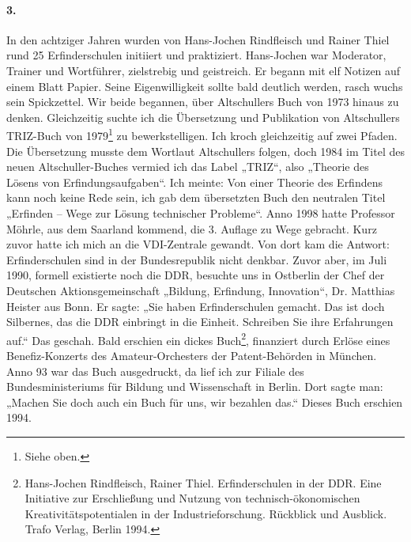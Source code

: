 \documentclass[12pt,a4paper]{article}
\begin{document}
\paragraph{3.}
In den achtziger Jahren wurden von Hans-Jochen Rindfleisch und Rainer Thiel
rund 25 Erfinderschulen initiiert und praktiziert. Hans-Jochen war Moderator,
Trainer und Wortführer, zielstrebig und geistreich. Er begann mit elf Notizen
auf einem Blatt Papier. Seine Eigenwilligkeit sollte bald deutlich werden,
rasch wuchs sein Spickzettel. Wir beide begannen, über Altschullers Buch von
1973 hinaus zu denken. Gleichzeitig suchte ich die Übersetzung und Publikation
von Altschullers TRIZ-Buch von 1979\footnote{Siehe oben.} zu bewerkstelligen.
Ich kroch gleichzeitig auf zwei Pfaden. Die Übersetzung musste dem Wortlaut
Altschullers folgen, doch 1984 im Titel des neuen Altschuller-Buches vermied
ich das Label „TRIZ“, also „Theorie des Lösens von Erfindungsaufgaben“. Ich
meinte: Von einer Theorie des Erfindens kann noch keine Rede sein, ich gab dem
übersetzten Buch den neutralen Titel „Erfinden – Wege zur Lösung technischer
Probleme“. Anno 1998 hatte Professor Möhrle, aus dem Saarland kommend, die
3. Auflage zu Wege gebracht. Kurz zuvor hatte ich mich an die VDI-Zentrale
gewandt. Von dort kam die Antwort: Erfinderschulen sind in der Bundesrepublik
nicht denkbar.  Zuvor aber, im Juli 1990, formell existierte noch die DDR,
besuchte uns in Ostberlin der Chef der Deutschen Aktionsgemeinschaft „Bildung,
Erfindung, Innovation“, Dr. Matthias Heister aus Bonn. Er sagte: „Sie haben
Erfinderschulen gemacht.  Das ist doch Silbernes, das die DDR einbringt in die
Einheit.  Schreiben Sie ihre Erfahrungen auf.“ Das geschah. Bald erschien ein
dickes Buch\footnote{Hans-Jochen Rindfleisch, Rainer Thiel. Erfinderschulen in
  der DDR. Eine Initiative zur Erschließung und Nutzung von
  technisch-ökonomischen Kreativitätspotentialen in der Industrieforschung.
  Rückblick und Ausblick.  Trafo Verlag, Berlin 1994.}, finanziert durch
Erlöse eines Benefiz-Konzerts des Amateur-Orchesters der Patent-Behörden in
München. Anno 93 war das Buch ausgedruckt, da lief ich zur Filiale des
Bundesministeriums für Bildung und Wissenschaft in Berlin.  Dort sagte man:
„Machen Sie doch auch ein Buch für uns, wir bezahlen das.“ Dieses Buch
erschien 1994.
\end{document}
